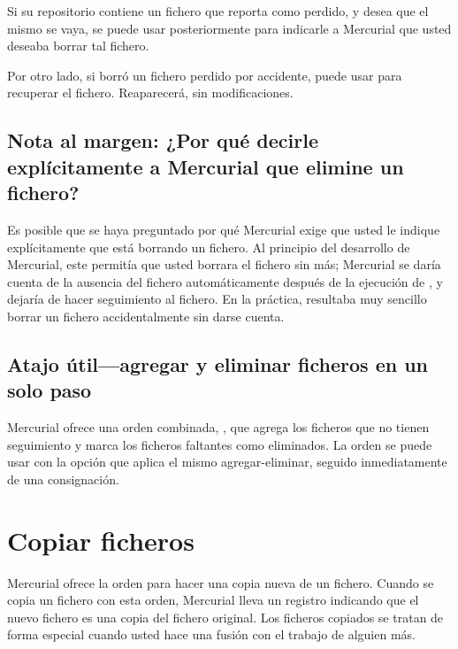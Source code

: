 Si su repositorio contiene un fichero que  reporta como
perdido, y desea que el mismo se vaya, se puede usar 
 posteriormente para
indicarle a Mercurial que usted deseaba borrar tal fichero.

Por otro lado, si borró un fichero perdido por accidente, puede usar
 para recuperar el
fichero. Reaparecerá, sin modificaciones.

\subsection{Nota al margen: ¿Por qué decirle explícitamente a Mercurial
  que elimine un fichero?}

Es posible que se haya preguntado por qué Mercurial exige que usted le
indique explícitamente que está borrando un fichero. Al principio del
desarrollo de Mercurial, este permitía que usted borrara el fichero
sin más; Mercurial se daría cuenta de la ausencia del fichero
automáticamente después de la ejecución de , y dejaría de
hacer seguimiento al fichero.  En la práctica, resultaba muy sencillo
borrar un fichero accidentalmente sin darse cuenta.

\subsection{Atajo útil---agregar y eliminar ficheros en un solo paso}

Mercurial ofrece una orden combinada, , que agrega
los ficheros que no tienen seguimiento y marca los ficheros faltantes
como eliminados.
La orden  se puede usar con la opción  
que aplica el mismo agregar-eliminar, seguido inmediatamente de una
consignación.

\section{Copiar ficheros}

Mercurial ofrece la orden  para hacer una copia nueva de
un fichero.  Cuando se copia un fichero con esta orden, Mercurial
lleva un registro indicando que el nuevo fichero es una copia del
fichero original. Los ficheros copiados se tratan de forma especial  cuando
usted hace una fusión con el trabajo de alguien más.

